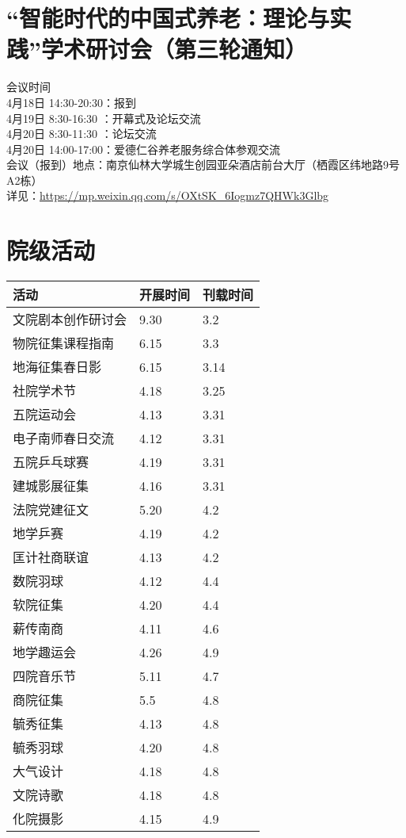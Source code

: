 \documentclass[letterpaper, 12pt]{article}
\begin{document}
\begin{multicols}{2}
\section{“智能时代的中国式养老：理论与实践”学术研讨会（第三轮通知）}
会议时间
\\4月18日 14:30-20:30：报到
\\4月19日 8:30-16:30 ：开幕式及论坛交流
\\4月20日 8:30-11:30 ：论坛交流
\\4月20日 14:00-17:00：爱德仁谷养老服务综合体参观交流
\\会议（报到）地点：南京仙林大学城生创园亚朵酒店前台大厅（栖霞区纬地路9号A2栋）
\\详见：\url{https://mp.weixin.qq.com/s/OXtSK_6Iogmz7QHWk3Glbg}
\section{院级活动}
\begin{tabular}{|>{\centering\arraybackslash}m{}|m{}|m{}|}
\hline
    活动 & 开展时间 & 刊载时间\\
    \hline\hline
    文院剧本创作研讨会 & 9.30 & 3.2\\
    物院征集课程指南 & 6.15 & 3.3\\
    地海征集春日影 & 6.15 & 3.14\\
    社院学术节 & 4.18 & 3.25\\
    五院运动会 & 4.13 & 3.31\\
    电子南师春日交流 & 4.12 & 3.31\\
    五院乒乓球赛 & 4.19 & 3.31\\
    建城影展征集 & 4.16 & 3.31\\
    法院党建征文 & 5.20 & 4.2\\
    地学乒赛 & 4.19 & 4.2\\
    匡计社商联谊 & 4.13 & 4.2\\
    数院羽球 & 4.12 & 4.4\\
    软院征集 & 4.20 & 4.4\\
    薪传南商 & 4.11 & 4.6\\
    地学趣运会 & 4.26 & 4.9\\
    四院音乐节 & 5.11 & 4.7\\
    商院征集 & 5.5 & 4.8\\
    毓秀征集 & 4.13 & 4.8\\
    毓秀羽球 & 4.20 & 4.8\\
    大气设计 & 4.18 & 4.8\\
    文院诗歌 & 4.18 & 4.8\\
    化院摄影 & 4.15 & 4.9\\
    \hline
\end{tabular}

\end{multicols}
\end{document}
